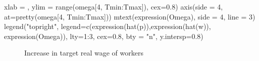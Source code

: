 \documentclass[
  letterpaper,
  DIV=11,
  numbers=noendperiod]{scrreprt}
\newenvironment{Shaded}{\begin{snugshade}}{\end{snugshade}}
\newcommand{\AttributeTok}[1]{\textcolor[rgb]{0.40,0.45,0.13}{#1}}
\newcommand{\DecValTok}[1]{\textcolor[rgb]{0.68,0.00,0.00}{#1}}
\newcommand{\FloatTok}[1]{\textcolor[rgb]{0.68,0.00,0.00}{#1}}
\newcommand{\FunctionTok}[1]{\textcolor[rgb]{0.28,0.35,0.67}{#1}}
\newcommand{\NormalTok}[1]{\textcolor[rgb]{0.00,0.23,0.31}{#1}}
\newcommand{\SpecialCharTok}[1]{\textcolor[rgb]{0.37,0.37,0.37}{#1}}
\newcommand{\StringTok}[1]{\textcolor[rgb]{0.13,0.47,0.30}{#1}}
\begin{document}
\begin{Shaded}
\begin{Highlighting}[]
     \AttributeTok{xlab =} \StringTok{\textquotesingle{}\textquotesingle{}}\NormalTok{, }\AttributeTok{ylim =} \FunctionTok{range}\NormalTok{(omega[}\DecValTok{4}\NormalTok{, Tmin}\SpecialCharTok{:}\NormalTok{Tmax]), }\AttributeTok{cex=}\FloatTok{0.8}\NormalTok{)}
\FunctionTok{axis}\NormalTok{(}\AttributeTok{side =} \DecValTok{4}\NormalTok{, }\AttributeTok{at=}\FunctionTok{pretty}\NormalTok{(omega[}\DecValTok{4}\NormalTok{, Tmin}\SpecialCharTok{:}\NormalTok{Tmax]))  }
\FunctionTok{mtext}\NormalTok{(}\FunctionTok{expression}\NormalTok{(Omega), }\AttributeTok{side =} \DecValTok{4}\NormalTok{, }\AttributeTok{line =} \DecValTok{3}\NormalTok{)}
\FunctionTok{legend}\NormalTok{(}\StringTok{"topright"}\NormalTok{, }\AttributeTok{legend=}\FunctionTok{c}\NormalTok{(}\FunctionTok{expression}\NormalTok{(}\FunctionTok{hat}\NormalTok{(p)),}\FunctionTok{expression}\NormalTok{(}\FunctionTok{hat}\NormalTok{(w)), }\FunctionTok{expression}\NormalTok{(Omega)),}
       \AttributeTok{lty=}\DecValTok{1}\SpecialCharTok{:}\DecValTok{3}\NormalTok{, }\AttributeTok{cex=}\FloatTok{0.8}\NormalTok{, }\AttributeTok{bty =} \StringTok{"n"}\NormalTok{, }\AttributeTok{y.intersp=}\FloatTok{0.8}\NormalTok{)}
\end{Highlighting}
\end{Shaded}

\begin{figure}[H]


\caption{\label{fig-targetrealwage}Increase in target real wage of
workers}

\end{figure}%
\end{document}
